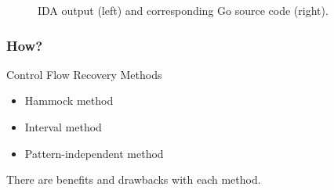 \documentclass[aspectratio=1610]{beamer}
\begin{document}
\begin{frame}
\begin{figure}[htbp]
\begin{subfigure}[ht]{0.30\textwidth}
		\end{subfigure}
		\begin{subfigure}[ht]{0.40\textwidth}
			\centering
			
		\end{subfigure}
		\caption{IDA output (left) and corresponding Go source code (right).}
	\end{figure}
\end{frame}




\begin{frame}
	\frametitle{How?}

	\begin{block}{Control Flow Recovery Methods}
		\begin{itemize}
			\item Hammock method
			\item Interval method
			\item Pattern-independent method
		\end{itemize}
	\end{block}

	There are benefits and drawbacks with each method.
\end{frame}
















\end{document}
